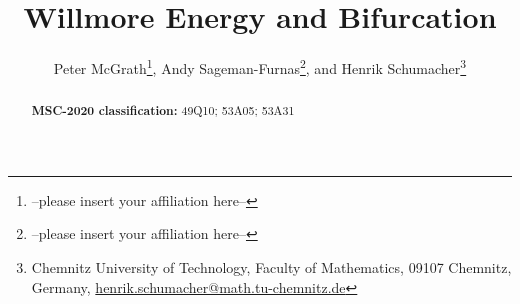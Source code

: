 \documentclass[
	final%
	,12pt%
	,pagesize%
	,headings=normal%
	,paper=a4%
	,parskip=false%
	,headsepline=true%
	,abstract=true%
]{scrartcl}
\title{Willmore Energy and Bifurcation}
\author{
{Peter McGrath\thanks{--please insert your affiliation here--}},
{Andy Sageman-Furnas\thanks{--please insert your affiliation here--}},
{} and {}
{Henrik Schumacher\thanks{Chemnitz University of Technology,
Faculty of Mathematics, 09107 Chemnitz, Germany, \href{mailto:henrik.schumacher@math.tu-chemnitz.de
}{henrik.schumacher@math.tu-chemnitz.de}}}
}
\begin{document}
\maketitle

\begin{abstract}
\begin{small}


\noindent
\textbf{MSC-2020 classification:} 
  49Q10; %
  53A05; %
  53A31  %
\end{small}
\end{abstract}













%

%


%
%

%
\begin{small}
\setlength{\parskip}{0.5ex}

\end{small}
\end{document}
